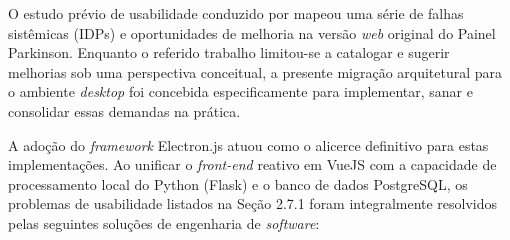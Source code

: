 O estudo prévio de usabilidade conduzido por \cite{rabelo2025} mapeou uma série de falhas sistêmicas (IDPs) e oportunidades de melhoria na versão \textit{web} original do Painel Parkinson. Enquanto o referido trabalho limitou-se a catalogar e sugerir melhorias sob uma perspectiva conceitual, a presente migração arquitetural para o ambiente \textit{desktop} foi concebida especificamente para implementar, sanar e consolidar essas demandas na prática. 

A adoção do \textit{framework} Electron.js atuou como o alicerce definitivo para estas implementações. Ao unificar o \textit{front-end} reativo em VueJS com a capacidade de processamento local do Python (Flask) e o banco de dados PostgreSQL, os problemas de usabilidade listados na Seção 2.7.1 foram integralmente resolvidos pelas seguintes soluções de engenharia de \textit{software}:

